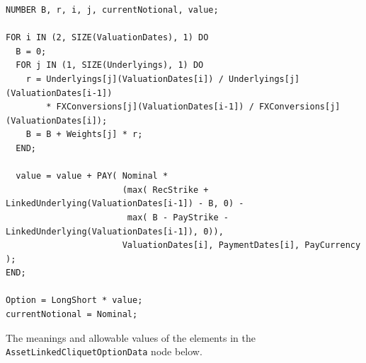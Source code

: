 \begin{listing}[hbt]
\begin{verbatim}
NUMBER B, r, i, j, currentNotional, value;

FOR i IN (2, SIZE(ValuationDates), 1) DO
  B = 0;
  FOR j IN (1, SIZE(Underlyings), 1) DO
    r = Underlyings[j](ValuationDates[i]) / Underlyings[j](ValuationDates[i-1])
        * FXConversions[j](ValuationDates[i-1]) / FXConversions[j](ValuationDates[i]);
    B = B + Weights[j] * r;
  END;

  value = value + PAY( Nominal *
                       (max( RecStrike + LinkedUnderlying(ValuationDates[i-1]) - B, 0) -
                        max( B - PayStrike - LinkedUnderlying(ValuationDates[i-1]), 0)),
                       ValuationDates[i], PaymentDates[i], PayCurrency );
END;

Option = LongShort * value;
currentNotional = Nominal;
\end{verbatim}
\caption{Payoff script for an Asset Linked Cliquet Option.}
\label{lst:asset_linked_cliquet_option}
\end{listing}

The meanings and allowable values of the elements in the \lstinline!AssetLinkedCliquetOptionData!
node below.

